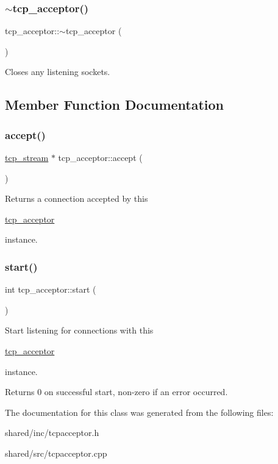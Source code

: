 \subsubsection{\texorpdfstring{$\sim$tcp\+\_\+acceptor()}{~tcp\_acceptor()}}
{\footnotesize\ttfamily tcp\+\_\+acceptor\+::$\sim$tcp\+\_\+acceptor (\begin{DoxyParamCaption}{ }\end{DoxyParamCaption})}

Closes any listening sockets. 

\subsection{Member Function Documentation}
\mbox{\label{classtcp__acceptor_a44b6f54d8d69d313091d3ae8991bf696}} 
\subsubsection{\texorpdfstring{accept()}{accept()}}
{\footnotesize\ttfamily \hyperlink{classtcp__stream}{tcp\+\_\+stream} $\ast$ tcp\+\_\+acceptor\+::accept (\begin{DoxyParamCaption}{ }\end{DoxyParamCaption})}

\begin{DoxyReturn}{Returns}
a connection accepted by this
\begin{DoxyCode}
\hyperlink{classtcp__acceptor}{tcp\_acceptor} 
\end{DoxyCode}
 instance. 
\end{DoxyReturn}
\mbox{\label{classtcp__acceptor_a15116195be2fa6d2b5f432cc0bdf0479}} 
\subsubsection{\texorpdfstring{start()}{start()}}
{\footnotesize\ttfamily int tcp\+\_\+acceptor\+::start (\begin{DoxyParamCaption}{ }\end{DoxyParamCaption})}

Start listening for connections with this
\begin{DoxyCode}
\hyperlink{classtcp__acceptor}{tcp\_acceptor} 
\end{DoxyCode}
 instance.

\begin{DoxyReturn}{Returns}
0 on successful start, non-\/zero if an error occurred. 
\end{DoxyReturn}


The documentation for this class was generated from the following files\+:\begin{DoxyCompactItemize}
\item 
shared/inc/tcpacceptor.\+h\item 
shared/src/tcpacceptor.\+cpp\end{DoxyCompactItemize}
